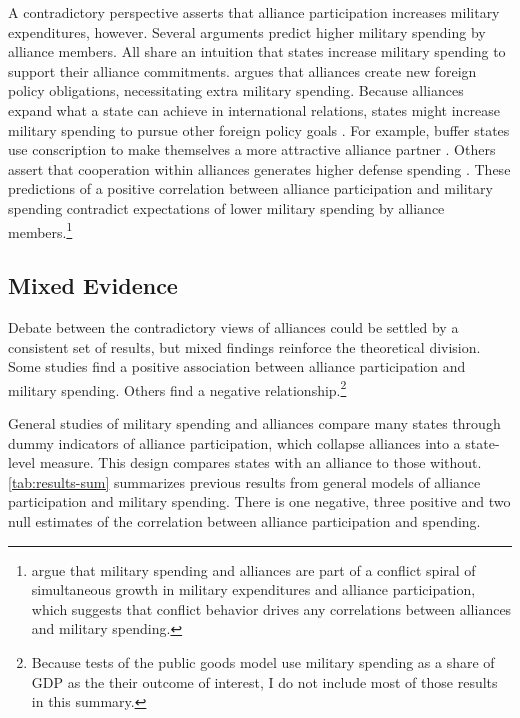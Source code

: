 \documentclass[12pt]{article}
\begin{document}
A contradictory perspective asserts that alliance participation increases military expenditures, however. 
Several arguments predict higher military spending by alliance members.
All share an intuition that states increase military spending to support their alliance commitments. 
\citet{Diehl1994} argues that alliances create new foreign policy obligations, necessitating extra military spending.
Because alliances expand what a state can achieve in international relations, states might increase military spending to pursue other foreign policy goals \citep{MorganPalmer2006}.
For example, buffer states use conscription to make themselves a more attractive alliance partner \citep{Horowitzetal2017}.
Others assert that cooperation within alliances generates higher defense spending \citep{Palmer1990, QuirozFlores2011}. 
These predictions of a positive correlation between alliance participation and military spending contradict expectations of lower military spending by alliance members.\footnote{
\citet{SeneseVasquez2008} argue that military spending and alliances are part of a conflict spiral of simultaneous growth in military expenditures and alliance participation, which suggests that conflict behavior drives any correlations between alliances and military spending. 
}


\subsection{Mixed Evidence} 


Debate between the contradictory views of alliances could be settled by a consistent set of results, but mixed findings reinforce the theoretical division.
Some studies find a positive association between alliance participation and military spending. 
Others find a negative relationship.\footnote{
Because tests of the public goods model use military spending as a share of GDP as the their outcome of interest, I do not include most of those results in this summary.} 


General studies of military spending and alliances compare many states through dummy indicators of alliance participation, which collapse alliances into a state-level measure. 
This design compares states with an alliance to those without.
\autoref{tab:results-sum} summarizes previous results from general models of alliance participation and military spending. 
There is one negative, three positive and two null estimates of the correlation between alliance participation and spending. 
\end{document}
